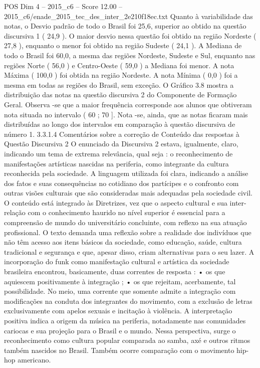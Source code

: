 \begin{textsample}{POS Dim 4 – 2015\_c6 – Score 12.00 – 2015\_c6/enade\_2015\_tec\_des\_inter\_2e210f18ec.txt}
Quanto à variabilidade das notas, o Desvio padrão de todo o Brasil foi 25,6, superior ao obtido na questão discursiva 1 ( 24,9 ).
O maior desvio nessa questão foi obtido na região Nordeste ( 27,8 ), enquanto o menor foi obtido na região Sudeste ( 24,1 ).
A Mediana de todo o Brasil foi 60,0, a mesma das regiões Nordeste, Sudeste e Sul, enquanto nas regiões Norte ( 56,0 ) e Centro-Oeste ( 59,0 ) a Mediana foi menor.
A nota Máxima ( 100,0 ) foi obtida na região Nordeste.
A nota Mínima ( 0,0 ) foi a mesma em todas as regiões do Brasil, sem exceção.
O Gráfico 3.8 mostra a distribuição das notas na questão discursiva 2 do Componente de Formação Geral.
Observa -se que a maior frequência corresponde aos alunos que obtiveram nota situada no intervalo ( 60 ; 70 ].
Nota -se, ainda, que as notas ficaram mais distribuídas ao longo dos intervalos em comparação à questão discursiva de número 1. 3.3.1.4 Comentários sobre a correção de Conteúdo das respostas à Questão Discursiva 2 O enunciado da Discursiva 2 estava, igualmente, claro, indicando um tema de extrema relevância, qual seja : o reconhecimento de manifestações artísticas nascidas na periferia, como integrante da cultura reconhecida pela sociedade.
A linguagem utilizada foi clara, indicando a análise dos fatos e suas consequências no cotidiano dos partícipes e o confronto com outras visões culturais que são consideradas mais adequadas pela sociedade civil.
O conteúdo está integrado às Diretrizes, vez que o aspecto cultural e sua inter-relação com o conhecimento haurido no nível superior é essencial para a compreensão de mundo do universitário concluinte, com reflexo na sua atuação profissional.
O texto demanda uma reflexão sobre a realidade dos indivíduos que não têm acesso aos itens básicos da sociedade, como educação, saúde, cultura tradicional e segurança e que, apesar disso, criam alternativas para o seu lazer.
A incorporação do funk como manifestação cultural e artística da sociedade brasileira encontrou, basicamente, duas correntes de resposta : • os que aquiescem positivamente à integração ; • os que rejeitam, acerbamente, tal possibilidade.
No meio, uma corrente que somente admite a integração com modificações na conduta dos integrantes do movimento, com a exclusão de letras exclusivamente com apelos sexuais e incitação à violência.
A interpretação positiva indica a origem da música na periferia, notadamente nas comunidades cariocas e sua projeção para o Brasil e o mundo.
Nessa perspectiva, surge o reconhecimento como cultura popular comparada ao samba, axé e outros ritmos também nascidos no Brasil.
Também ocorre comparação com o movimento hip-hop americano.

\end{textsample}
